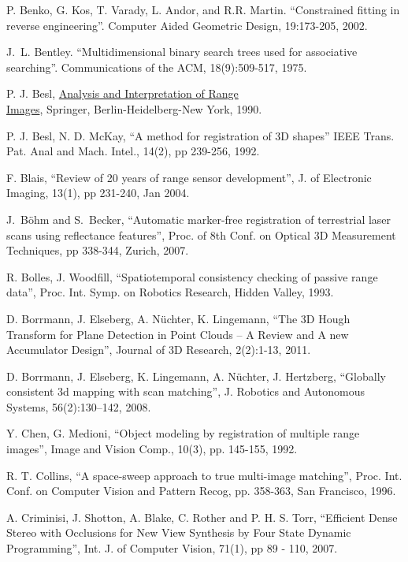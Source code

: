 \documentclass[twocolumn,oneside]{book}
\begin{document}
\begin{thebibliography}{99}
P. Benko, G. Kos, T. Varady, L. Andor, and R.R. Martin.
``Constrained fitting in reverse engineering''. 
Computer Aided Geometric Design, 19:173-205, 2002.

J.~L. Bentley.
``Multidimensional binary search trees used for associative searching''.
Communications of the ACM, 18(9):509-517, 1975.

P. J. Besl,
{\underline{Analysis and Interpretation of Range}}\\{\underline {Images}},
Springer, Berlin-Heidelberg-New York, 1990.

P. J. Besl, N. D. McKay,
``A method for registration of 3D shapes''
IEEE Trans. Pat. Anal and Mach. Intel., 14(2), pp 239-256, 1992.

F. Blais,
``Review of 20 years of range sensor development'',
J. of Electronic Imaging, 13(1), pp 231-240, Jan 2004.

J.~B{\"o}hm and S.~Becker,
``Automatic marker-free registration of terrestrial laser scans using reflectance features'',
Proc. of 8th Conf. on Optical 3D Measurement
  Techniques, pp 338-344, Zurich, 2007.

R. Bolles, J. Woodfill, 
``Spatiotemporal consistency checking of passive range data'',  
Proc. Int. Symp. on Robotics Research, Hidden Valley, 1993.

D. Borrmann, J. Elseberg, A. N{\"u}chter, K. Lingemann,
``The 3D Hough Transform for Plane Detection in Point Clouds -- A Review and A new Accumulator Design'',
Journal of 3D Research, 2(2):1-13, 2011.

D. Borrmann, J. Elseberg, K. Lingemann, A. N{\"u}chter, J. Hertzberg,
``Globally consistent 3d mapping with scan matching'',
J. Robotics and Autonomous Systems, 56(2):130–142, 2008.

Y. Chen, G. Medioni,
``Object modeling by registration of multiple range images'',
Image and Vision Comp., 10(3), pp. 145-155, 1992.

R. T. Collins,
``A space-sweep approach to true multi-image matching'', 
Proc. Int. Conf. on Computer Vision and Pattern Recog, pp. 358-363, San Francisco, 1996.

A.  Criminisi, J. Shotton, A. Blake, C. Rother and P. H. S. Torr,
``Efficient Dense Stereo with Occlusions for New View Synthesis by Four State Dynamic Programming'', 
Int. J. of Computer Vision, 71(1), pp 89 - 110, 2007.


\end{thebibliography}
\end{document}
